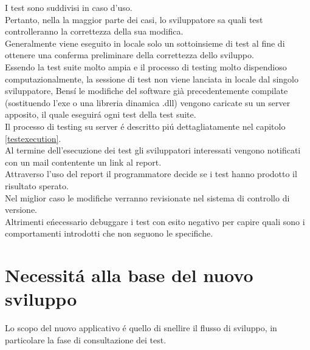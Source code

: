         I test sono suddivisi in caso d'uso.\\
        Pertanto, nella la maggior parte dei casi, lo sviluppatore sa quali test  controlleranno la correttezza della sua modifica.\\
        Generalmente viene eseguito in locale solo un sottoinsieme di test al fine di ottenere una conferma preliminare della correttezza dello sviluppo.\\

        Essendo la test suite molto ampia e il processo di testing molto dispendioso computazionalmente, 
        la sessione di test non viene lanciata in locale dal singolo sviluppatore, 
        Bens\'i  le modifiche del software già precedentemente compilate (sostituendo l’exe o una libreria dinamica .dll) 
        vengono caricate su un server apposito, il quale eseguir\'a ogni test della test suite.\\

        Il processo di testing su server \'e descritto pi\'u dettagliatamente nel capitolo \ref{testexecution}.\\
        
        Al termine dell'esecuzione dei test gli sviluppatori interessati vengono notificati con un mail contentente un link al report.\\
        Attraverso l'uso del report il programmatore decide se i test hanno prodotto il risultato sperato.\\
        Nel miglior caso le modifiche verranno revisionate nel sistema di controllo di versione.\\
        Altrimenti e\' necessario debuggare i test con esito negativo per capire quali sono i comportamenti introdotti che non seguono le specifiche. \\

    \section{Necessit\'a alla base del nuovo sviluppo}
        Lo scopo del nuovo applicativo \'e quello di snellire il flusso di sviluppo, in particolare la fase di consultazione dei test.\\

